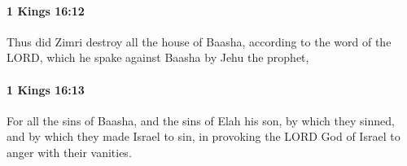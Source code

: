 		\paragraph{1 Kings 16:12} %
			\label{1KINGS-16-12}

			Thus did Zimri destroy all the house of Baasha, according to the word of the LORD, which he spake against Baasha by Jehu the prophet,


		\paragraph{1 Kings 16:13} %
			\label{1KINGS-16-13}

			For all the sins of Baasha, and the sins of Elah his son, by which they sinned, and by which they made Israel to sin, in provoking the LORD God of Israel to anger with their vanities.


